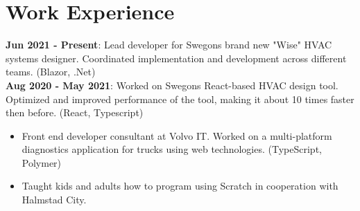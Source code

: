 \documentclass[11pt,a4paper,sans,colorlinks,linkcolor=blue,urlcolor=blue]{moderncv}
\begin{document}
\makecvtitle
\setlength{\parskip}{0.15em}
\vspace{-40.0pt}

\section{Work Experience}
{
\textbf{Jun 2021 - Present}: Lead developer for Swegons brand new "Wise" HVAC systems designer. Coordinated implementation and development across different teams. (Blazor, .Net)
\\
\textbf{Aug 2020 - May 2021}: Worked on Swegons React-based HVAC design tool. Optimized and improved performance of the tool, making it about 10 times faster then before. (React, Typescript)
}

{\begin{itemize}
    \itemsep0.3em
    \setlength{\itemindent}{.25in}
    \item Front end developer consultant at Volvo IT. Worked on a multi-platform diagnostics application for trucks using web technologies. (TypeScript, Polymer)
\end{itemize}}

{\begin{itemize}
    \itemsep0.3em
    \setlength{\itemindent}{.25in}
    \item Taught kids and adults how to program using Scratch in cooperation with Halmstad City.
\end{itemize}}

\end{document}
